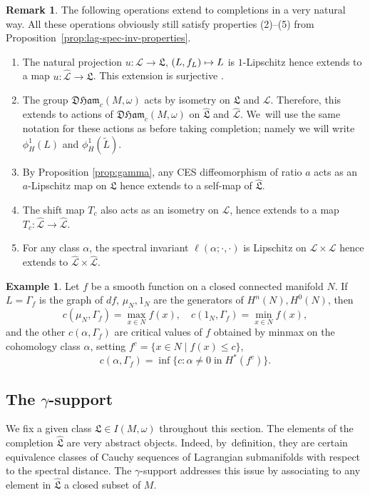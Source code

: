 \documentclass[JEP,XML,SOM,Unicode,NoFloatCountersInSection,published]{cedram}
\newcommand\mto{\mathchoice{\longmapsto}{\mapsto}{\mapsto}{\mapsto}}
\theoremstyle{definition}
\newtheorem{rem}[thm]{Remark}
\newtheorem{example}[thm]{Example}
\newcommand {\LL}{{\mathcal L}}
\newcommand{\DHam}{\mathfrak{DHam}}
\newcommand{\fL}{\mathfrak {L}}
\newcommand{\hatL}{\widehat{\fL}}
\newcommand{\hatLL}{\widehat{\LL}}
\begin{document}
\begin{rem}\label{rem:completions} The following operations extend to completions in a very natural way. All these operations obviously still satisfy properties (2)--(5) from Proposition~\ref{prop:lag-spec-inv-properties}.
\begin{enumerate}
\item The natural projection $u:\LL\to\fL$, $(L, f_L)\mto L$ is $1$-Lipschitz hence extends to a map $u:\hatLL\to\hatL$. This extension is surjective \cite[Prop.\,5.5]{Viterbo-gammas}.
\item The group $\DHam_c(M,\omega)$ acts by isometry on $\fL$ and $\LL$. Therefore, this extends to actions of $\DHam_c(M,\omega)$ on $\hatL$ and $\hatLL$. We~will use the same notation for these actions as before taking completion; namely we will write $\phi_H^1(L)$ and $\phi_H^1(\tilde L)$.
\item By Proposition \ref{prop:gamma}, any CES diffeomorphism of ratio $a$ acts as an $a$-Lipschitz map on $\fL$ hence extends to a self-map of $\hatL$.
\item The shift map $T_c$ also acts as an isometry on $\LL$, hence extends to a map $T_c:\hatLL\to\hatLL$.
\item For any class $\alpha$, the spectral invariant $\ell(\alpha;\cdot, \cdot)$ is Lipschitz on $\LL\times\LL$ hence extends to $\hatLL\times\hatLL$.
\end{enumerate}
\end{rem}
\begin{example}
Let $f$ be a smooth function on a closed connected manifold $N$. If~$L=\Gamma_f$ is the graph of $df$, $\mu_N, 1_N$ are the generators of $H^n(N), H^0(N)$, then
\[
c(\mu_N,\Gamma_{f})=\max_{x\in N}f(x),\quad c(1_N,\Gamma_{f})=\min_{x\in N}f(x),
\]
and the other $c(\alpha,\Gamma_{f})$ are critical values of $f$ obtained by minmax on the cohomology class $\alpha$, \ie setting $f^c=\{x\in N \mid f(x)\leq c\}$,
\[
c(\alpha,\Gamma_f)=\inf\{c : \alpha \neq 0\;\text{in}\; H^*(f^c)\}.
\]
\end{example}

\subsection{The \texorpdfstring{$\gamma$}{gamma}-support}\label{sec:gamma-support}

We fix a given class $\fL\in I(M,\omega)$ throughout this section. The elements of the completion $\hatL$ are very abstract objects. Indeed, by~definition, they are certain equivalence classes of Cauchy sequences of Lagrangian submanifolds with respect to the spectral distance. The $\gamma$\nobreakdash-support addresses this issue by associating to any element in $\hatL$ a closed subset of $M$.
\end{document}
